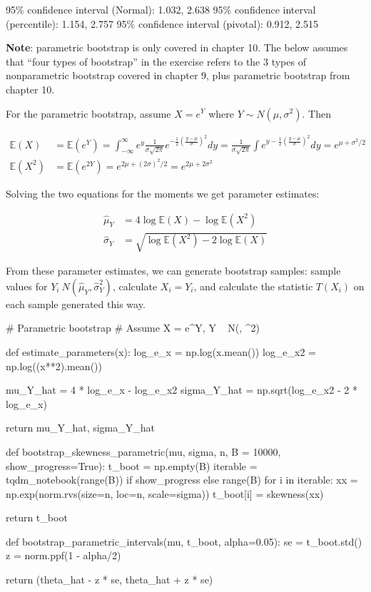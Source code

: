 \begin{console}
95\% confidence interval (Normal):        1.032, 2.638
95\% confidence interval (percentile):    1.154, 2.757
95\% confidence interval (pivotal):       0.912, 2.515
\end{console}

\textbf{Note}: parametric bootstrap is only covered in chapter 10. The
below assumes that ``four types of bootstrap'' in the exercise refers to
the 3 types of nonparametric bootstrap covered in chapter 9, plus
parametric bootstrap from chapter 10.

For the parametric bootstrap, assume \(X = e^Y\) where
\(Y \sim N(\mu, \sigma^{2})\). Then

\begin{align*}
\mathbb{E}(X) & = \mathbb{E}(e^Y) = \int_{-\infty}^{\infty} e^y \frac{1}{\sigma \sqrt{2 \pi}} e^{-\frac{1}{2} \left(\frac{y - \mu}{\sigma} \right)^{2}} dy = \frac{1}{\sigma \sqrt{2 \pi}} \int e^{y - \frac{1}{2}\left(\frac{y - \mu}{\sigma}\right)^{2}} dy = e^{\mu + \sigma^{2}/2} \\
\mathbb{E}(X^{2}) &= \mathbb{E}(e^{2Y}) = e^{2\mu + (2\sigma)^{2}/2} = e^{2\mu + 2\sigma^{2}}
\end{align*}

Solving the two equations for the moments we get parameter estimates:

\begin{align*}
\hat{\mu}_Y & = 4 \log \mathbb{E}(X) - \log \mathbb{E}(X^{2}) \\
\hat{\sigma}_Y & = \sqrt{\log \mathbb{E}(X^{2}) - 2 \log \mathbb{E}(X)}
\end{align*}

From these parameter estimates, we can generate bootstrap samples:
sample values for \(Y_{i} ~ N(\hat{\mu}_Y, \hat{\sigma}_Y^{2})\), calculate
\(X_{i} = Y_{i}\), and calculate the statistic \(T(X_{i})\) on each sample
generated this way.

\begin{python}
# Parametric bootstrap
# Assume X = e^Y, Y ~ N(\mu, \sigma^{2})

def estimate_parameters(x):
    log_e_x = np.log(x.mean())
    log_e_x2 = np.log((x**2).mean())
    
    mu_Y_hat = 4 * log_e_x - log_e_x2
    sigma_Y_hat = np.sqrt(log_e_x2 - 2 * log_e_x)
    
    return mu_Y_hat, sigma_Y_hat

def bootstrap_skewness_parametric(mu, sigma, n, B = 10000, show_progress=True):
    t_boot = np.empty(B)
    iterable = tqdm_{n}otebook(range(B)) if show_progress else range(B)
    for i in iterable:
        xx = np.exp(norm.rvs(size=n, loc=n, scale=sigma))
        t_boot[i] = skewness(xx)
        
    return t_boot

def bootstrap_parametric_{i}ntervals(mu, t_boot, alpha=0.05):
    se = t_boot.std()
    z = norm.ppf(1 - alpha/2)
    
    return (theta_hat - z * se, theta_hat + z * se)
\end{python}


